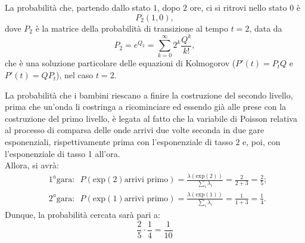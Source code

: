 \documentclass[11pt,largemargins]{homework}
\begin{document}
\begin{alphaparts}
\questionpart
La probabilità che, partendo dallo stato $1$, dopo $2$ ore, ci si ritrovi nello stato $0$ è
\begin{equation*}
P_{2}\left(1,0\right),
\end{equation*} 
dove $P_{2}$ è la matrice della probabilità di transizione al tempo $t= 2$, data da
\begin{equation*}
P_{2}=e^{Q_{2}}= \sum_{k=0}^{\infty}2^{k}\frac{Q^{k}}{k!},
\end{equation*}
che è una soluzione particolare delle equazioni di Kolmogorov ($P'\left(t\right)=P_{t}Q$ e $P'\left(t\right)=QP_{t}$), nel caso $t=2$.

\questionpart
La probabilità che i bambini riescano a finire la costruzione del secondo livello, prima che un'onda li costringa a ricominciare ed essendo già alle prese con la costruzione del primo livello, è legata al fatto che la variabile di Poisson relativa al processo di comparsa delle onde arrivi due volte seconda in due gare esponenziali, rispettivamente prima con l'esponenziale di tasso $2$ e, poi, con l'esponenziale di tasso 1 all'ora.\\
Allora, si avrà:
\begin{align*}
&1^{a} \text{gara}: \,\,\, P\left(\text{exp}\left(2\right) \text{arrivi primo}\right)=\frac{\lambda\left(\text{exp}\left(2\right)\right)}{\sum_{i}\lambda_{i}}=\frac{2}{2+3}=\frac{2}{5};\\
&2^{a} \text{gara}: \,\,\, P\left(\text{exp}\left(1\right) \text{arrivi primo}\right)=\frac{\lambda\left(\text{exp}\left(1\right)\right)}{\sum_{i}\lambda_{i}}=\frac{1}{1+3}=\frac{1}{4}.
\end{align*}  
Dunque, la probabilità cercata sarà pari a:
\begin{equation*}
\frac{2}{5}\cdot \frac{1}{4}=\frac{1}{10}
\end{equation*}
 \end{alphaparts}
    
    
\newpage
\end{document}
